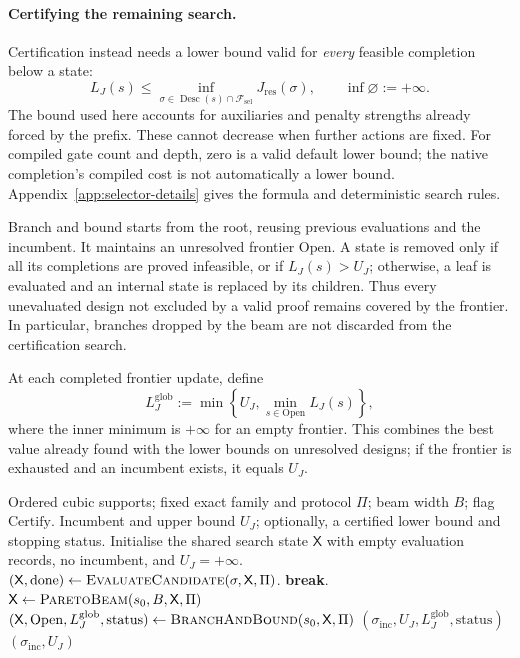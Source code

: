 \documentclass[a4paper,onecolumn,11pt,unpublished]{quantumarticle}
\theoremstyle{remark}
\begin{document}
\paragraph{Certifying the remaining search.}
Certification instead needs a lower bound valid for \emph{every} feasible
completion below a state:
\begin{equation}
L_J(s)\leq
\inf_{\sigma\in\operatorname{Desc}(s)\cap\mathcal F_{\mathrm{sel}}}
J_{\mathrm{res}}(\sigma),
\qquad \inf\varnothing:=+\infty.
\label{eq:admissible-bound}
\end{equation}
The bound used here accounts for auxiliaries and penalty strengths already
forced by the prefix.  These cannot decrease when further actions are fixed.
For compiled gate count and depth, zero is a valid default lower bound;
the native completion's compiled cost is not automatically a lower bound.
Appendix~\ref{app:selector-details} gives the formula and deterministic
search rules.

Branch and bound starts from the root, reusing previous evaluations and the
incumbent.  It maintains an unresolved frontier \(\mathrm{Open}\).  A state
is removed only if all its completions are proved infeasible, or if
\(L_J(s)>U_J\); otherwise, a leaf is evaluated and an internal state is
replaced by its children.  Thus every unevaluated design not excluded by a
valid proof remains covered by the frontier.  In particular, branches dropped
by the beam are not discarded from the certification search.

At each completed frontier update, define
\begin{equation}
L_J^{\mathrm{glob}}:=
\min\left\{U_J,\min_{s\in\mathrm{Open}}L_J(s)\right\},
\label{eq:global-lower-bound}
\end{equation}
where the inner minimum is \(+\infty\) for an empty frontier.  This combines
the best value already found with the lower bounds on unresolved designs;
if the frontier is exhausted and an incumbent exists, it equals \(U_J\).

\begin{algorithm}[H]
\caption{Compiler-aware representation selector}
\label{alg:selector}
\begin{algorithmic}[1]
\Require Ordered cubic supports; fixed exact family and protocol $\Pi$;
beam width $B$; flag $\mathrm{Certify}$.
\Ensure Incumbent and upper bound $U_J$; optionally, a certified lower bound
and stopping status.
\State Initialise the shared search state $\mathsf X$ with empty evaluation
records, no incumbent, and $U_J=+\infty$.
    \State $(\mathsf X,\mathrm{done})\gets\Call{EvaluateCandidate}{\sigma,\mathsf X,\Pi}$.
     \State \textbf{break}. \EndIf
\EndFor
\State $\mathsf X\gets\Call{ParetoBeam}{s_0,B,\mathsf X,\Pi}$
    \State $(\mathsf X,\mathrm{Open},L_J^{\mathrm{glob}},\mathrm{status})
    \gets\Call{BranchAndBound}{s_0,\mathsf X,\Pi}$
    \State \Return $(\sigma_{\mathrm{inc}},U_J,L_J^{\mathrm{glob}},\mathrm{status})$
\Else
    \State \Return $(\sigma_{\mathrm{inc}},U_J)$
\EndIf
\end{algorithmic}
\end{algorithm}
\end{document}
